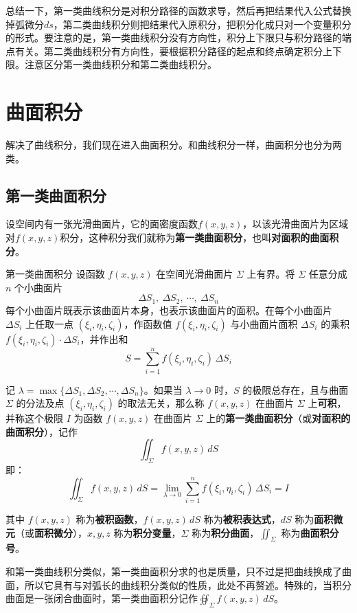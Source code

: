 总结一下，第一类曲线积分是对积分路径的函数求导，然后再把结果代入公式替换掉弧微分\(ds\)，第二类曲线积分则把结果代入原积分，把积分化成只对一个变量积分的形式。要注意的是，第一类曲线积分没有方向性，积分上下限只与积分路径的端点有关。第二类曲线积分有方向性，要根据积分路径的起点和终点确定积分上下限。注意区分第一类曲线积分和第二类曲线积分。

\section{曲面积分}
解决了曲线积分，我们现在进入曲面积分。和曲线积分一样，曲面积分也分为两类。

\subsection{第一类曲面积分}
设空间内有一张光滑曲面片，它的面密度函数\(f(x,y,z)\)，以该光滑曲面片为区域对\(f(x,y,z)\)积分，这种积分我们就称为\textbf{第一类曲面积分}，也叫\textbf{对面积的曲面积分}。
\begin{definition}{第一类曲面积分}{}
    设函数 \(f(x,y,z)\) 在空间光滑曲面片 \(\Sigma\) 上有界。将 \(\Sigma\) 任意分成 \(n\) 个小曲面片
\[
\Delta S_1,\ \Delta S_2,\ \cdots,\ \Delta S_n
\]
每个小曲面片既表示该曲面片本身，也表示该曲面片的面积。在每个小曲面片 \(\Delta S_i\) 上任取一点 \((\xi_i,\eta_i,\zeta_i)\)，作函数值 \(f(\xi_i,\eta_i,\zeta_i)\) 与小曲面片面积 \(\Delta S_i\) 的乘积 \(f(\xi_i,\eta_i,\zeta_i) \cdot \Delta S_i\)，并作出和
\[
S = \sum_{i=1}^{n} f(\xi_i,\eta_i,\zeta_i) \,\Delta S_i
\]

记 \(\lambda = \max\{\Delta S_1,\Delta S_2,\cdots,\Delta S_n\}\)。如果当 \(\lambda \to 0\) 时，\(S\) 的极限总存在，且与曲面 \(\Sigma\) 的分法及点 \((\xi_i,\eta_i,\zeta_i)\) 的取法无关，那么称 \(f(x,y,z)\) 在曲面片 \(\Sigma\) 上\textbf{可积}，并称这个极限 \(I\) 为函数 \(f(x,y,z)\) 在曲面片 \(\Sigma\) 上的\textbf{第一类曲面积分}（或\textbf{对面积的曲面积分}），记作
\[
\iint_{\Sigma} f(x,y,z)\,dS
\]
即：
\[
\iint_{\Sigma} f(x,y,z)\,dS = \lim_{\lambda \to 0} \sum_{i=1}^{n} f(\xi_i,\eta_i,\zeta_i)\,\Delta S_i = I
\]

其中 \(f(x,y,z)\) 称为\textbf{被积函数}，\(f(x,y,z)\,dS\) 称为\textbf{被积表达式}，\(dS\) 称为\textbf{面积微元}（或\textbf{面积微分}），\(x,y,z\) 称为\textbf{积分变量}，\(\Sigma\) 称为\textbf{积分曲面}，\(\iint_{\Sigma}\) 称为\textbf{曲面积分号}。
\end{definition}

和第一类曲线积分类似，第一类曲面积分求的也是质量，只不过是把曲线换成了曲面，所以它具有与对弧长的曲线积分类似的性质，此处不再赘述。特殊的，当积分曲面是一张闭合曲面时，第一类曲面积分记作\(\oiint_{\Sigma} f(x,y,z)\,dS\)。

